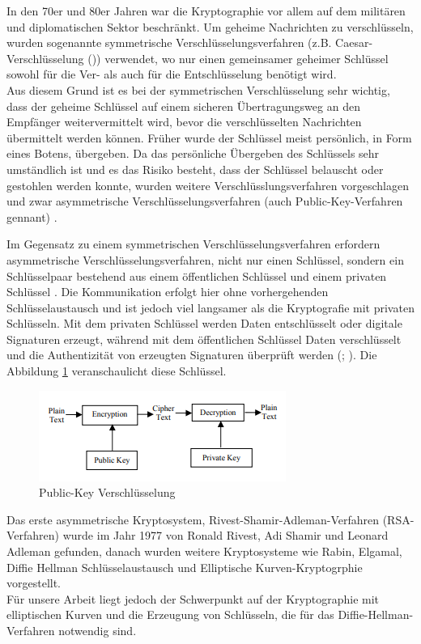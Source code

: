 In den 70er und 80er Jahren war die Kryptographie vor allem auf dem militären und diplomatischen Sektor beschränkt. Um geheime Nachrichten zu verschlüsseln, wurden sogenannte symmetrische Verschlüsselungsverfahren (z.B. Caesar-Verschlüsselung (\cite{moVarol})) verwendet, wo nur einen gemeinsamer geheimer Schlüssel sowohl für die Ver- als auch für die Entschlüsselung benötigt wird.\\

Aus diesem Grund ist es bei der symmetrischen Verschlüsselung sehr wichtig, dass der geheime Schlüssel auf einem sicheren Übertragungsweg an den Empfänger weitervermittelt wird, bevor die verschlüsselten Nachrichten übermittelt werden können. Früher wurde der Schlüssel meist persönlich, in Form eines Botens, übergeben. 
Da das persönliche Übergeben des Schlüssels sehr umständlich ist und es das Risiko besteht, dass der Schlüssel belauscht oder gestohlen werden konnte, wurden weitere Verschlüsslungsverfahren vorgeschlagen und zwar asymmetrische Verschlüsselungsverfahren (auch Public-Key-Verfahren gennant) \cite{werner}. 

Im Gegensatz zu einem symmetrischen Verschlüsselungsverfahren erfordern asymmetrische Verschlüsselungsverfahren, nicht nur einen Schlüssel, sondern ein Schlüsselpaar bestehend aus einem öffentlichen Schlüssel und einem privaten Schlüssel \cite{damer}. Die Kommunikation erfolgt hier ohne vorhergehenden Schlüsselaustausch und ist jedoch viel langsamer als die Kryptografie mit privaten Schlüsseln. Mit dem privaten Schlüssel werden Daten entschlüsselt oder digitale Signaturen erzeugt, während mit dem öffentlichen Schlüssel Daten verschlüsselt und die Authentizität von erzeugten Signaturen überprüft  werden (\cite{sahuMa}; \cite{damer}). Die Abbildung \ref{key} veranschaulicht diese Schlüssel. 

\begin{figure}[!htb]
    \centering
    \includegraphics[width = 0.5 \textwidth]{Graphics/Fig1Encryption.png}
    \caption{Public-Key Verschlüsselung}
    \label{key}
\end{figure}


Das erste asymmetrische Kryptosystem, Rivest-Shamir-Adleman-Verfahren (RSA-Verfahren) wurde im Jahr 1977 von Ronald Rivest, Adi Shamir und Leonard Adleman gefunden, 
danach wurden weitere Kryptosysteme wie Rabin, Elgamal, Diffie Hellman Schlüsselaustausch und Elliptische Kurven-Kryptogrphie vorgestellt.\\
Für unsere Arbeit liegt jedoch der Schwerpunkt auf der Kryptographie mit elliptischen Kurven und die Erzeugung von Schlüsseln, die für das Diffie-Hellman-Verfahren notwendig sind.\\

